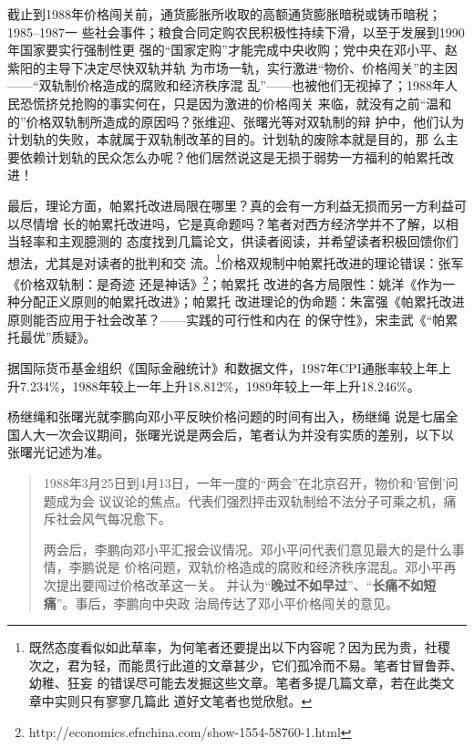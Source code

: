 截止到1988年价格闯关前，通货膨胀所收取的高额通货膨胀暗税或铸币暗税；1985--1987一
些社会事件；粮食合同定购农民积极性持续下滑，以至于发展到1990年国家要实行强制性更
强的“国家定购”才能完成中央收购；党中央在邓小平、赵紫阳的主导下决定尽快双轨并轨
为市场一轨，实行激进“物价、价格闯关”的主因——“双轨制价格造成的腐败和经济秩序混
乱”——也被他们无视掉了；1988年人民恐慌挤兑抢购的事实何在，只是因为激进的价格闯关
来临，就没有之前“温和的”价格双轨制所造成的原因吗？张维迎、张曙光等对双轨制的辩
护中，他们认为计划轨的失败，本就属于双轨制改革的目的。计划轨的废除本就是目的，那
么主要依赖计划轨的民众怎么办呢？他们居然说这是无损于弱势一方福利的帕累托改进！

最后，理论方面，帕累托改进局限在哪里？真的会有一方利益无损而另一方利益可以尽情增
长的帕累托改进吗，它是真命题吗？笔者对西方经济学并不了解，以相当轻率和主观臆测的
态度找到几篇论文，供读者阅读，并希望读者积极回馈你们想法，尤其是对读者的批判和交
流。\footnote{既然态度看似如此草率，为何笔者还要提出以下内容呢？因为民为贵，社稷
  次之，君为轻，而能贯行此道的文章甚少，它们孤冷而不易。笔者甘冒鲁莽、幼稚、狂妄
  的错误尽可能去发掘这些文章。笔者多提几篇文章，若在此类文章中实则只有寥寥几篇此
  道好文笔者也觉欣慰。}价格双规制中帕累托改进的理论错误：张军《价格双轨制：是奇迹
还是神话》\footnote{http://economics.efnchina.com/show-1554-58760-1.html}；帕累托
改进的各方局限性：姚洋《作为一种分配正义原则的帕累托改进》\cite{yaoyang}；帕累托
改进理论的伪命题：朱富强《帕累托改进原则能否应用于社会改革？——实践的可行性和内在
的保守性》\cite{zhufuqiang}，宋圭武《“帕累托最优”质疑》\cite{songguiwu}。

据国际货币基金组织《国际金融统计》和数据文件，1987年CPI通胀率较上年上
升7.234\%，1988年较上一年上升18.812\%，1989年较上一年上升18.246\%。

杨继绳\cite{yangshuanggui}和张曙光就李鹏向邓小平反映价格问题的时间有出入，杨继绳
说是七届全国人大一次会议期间，张曙光说是两会后，笔者认为并没有实质的差别，以下以
张曙光记述为准。
\begin{quotation}
  1988年3月25日到4月13日，一年一度的“两会”在北京召开，物价和‘官倒’问题成为会
  议议论的焦点。代表们强烈抨击双轨制给不法分子可乘之机，痛斥社会风气每况愈下。

  两会后，李鹏向邓小平汇报会议情况。邓小平问代表们意见最大的是什么事情，李鹏说是
  价格问题，双轨价格造成的腐败和经济秩序混乱。邓小平再次提出要闯过价格改革这一关。
  并认为“\textbf{晚过不如早过}”、“\textbf{长痛不如短痛}”。事后，李鹏向中央政
  治局传达了邓小平价格闯关的意见。
\end{quotation}

